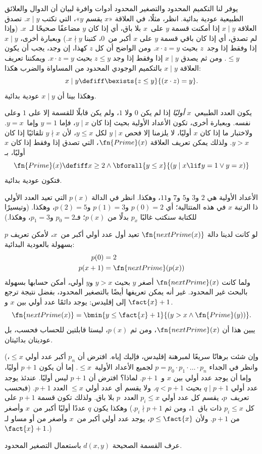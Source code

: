 \documentclass[../../../include/open-logic-section]{subfiles}
\begin{document}

يوفر لنا التكميم المحدود والتصغير المحدود أدوات وافرة لبيان أن الدوال
والعلائق الطبيعية عودية بدائية. انظر، مثلًا، في العلاقة «$x$ يقسم
$y$»، التي تكتب $x\mid y$. تصدق العلاقة $x\mid y$ إذا أمكنت قسمة
$y$ على~$x$ بلا باق، أي إذا كان $y$ مضاعفًا صحيحًا لـ~$x$. (وإذا لم
تصدق، أي إذا كان باقي قسمة $y$ على $x$ أكبر من~$0$، كتبنا
$x\nmid y$.) وبعبارة أخرى، $x\mid y$ إذا وفقط إذا وجد~$z$ بحيث
$x\cdot z=y$. ومن الواضح أن كل $z$ كهذا، إن وجد، يجب أن يكون
$\leq y$. ومن ثم يصدق $x\mid y$ إذا وفقط إذا وجد $z\le y$ بحيث
$x\cdot z=y$. ويمكننا تعريف العلاقة $x\mid y$ بالتكميم الوجودي
المحدود من المساواة والضرب هكذا:
\[
x \mid y \defiff \bexists{z \leq y}{(x \cdot z) = y}.
\]
وهكذا بينا أن $x\mid y$ عودية بدائية.

يكون العدد الطبيعي~$x$ \emph{أوليًا} إذا لم يكن $0$ ولا $1$، ولم
يكن قابلًا للقسمة إلا على $1$ وعلى نفسه. وبعبارة أخرى، تكون الأعداد
الأولية بحيث إذا كان $y\mid x$، فإما $y=1$ وإما~$y=x$. ولاختبار ما
إذا كان $x$ أوليًا، لا يلزمنا إلا فحص $y\mid x$ لكل $y\le x$، لأن
$y\nmid x$ تلقائيًا إذا كان $y>x$. ولذلك يمكن تعريف العلاقة
$\fn{Prime}(x)$، التي تصدق إذا وفقط إذا كان $x$ أوليًا، بـ
\[
\fn{Prime}(x) \defiff x \geq 2 \land \bforall{y \leq x}{(y \mid x \lif y
  = 1 \lor y = x)}
\]
فتكون عودية بدائية.

الأعداد الأولية هي $2$ و$3$ و$5$ و$7$ و$11$، وهكذا. انظر في الدالة
$p(x)$ التي تعيد العدد الأولي ذا الرتبة $x$ في هذه المتتالية؛ أي
$p(0)=2$ و$p(1)=3$ و$p(2)=5$، وهكذا. (وتيسيرًا للكتابة سنكتب غالبًا
$p_x$ بدلًا من $p(x)$؛ فـ$p_0=2$ و$p_1=3$، وهكذا.)

لو كانت لدينا دالة $\fn{nextPrime(x)}$ تعيد أول عدد أولي أكبر من~$x$،
لأمكن تعريف $p$ بسهولة بالعودية البدائية:
\begin{align*}
  p(0) & = 2\\
  p(x+1) & = \fn{nextPrime}(p(x))
\end{align*}
ولما كانت $\fn{nextPrime}(x)$ أصغر $y$ بحيث $y>x$ و$y$ أولي، أمكن
حسابها بسهولة بالبحث غير المحدود. غير أنه يمكن تعريفها أيضًا بالتصغير
المحدود، بفضل نتيجة ترجع إلى إقليدس: يوجد دائمًا عدد أولي بين $x$ و
$\fact{x}+1$.
\[
  \fn{nextPrime(x)} =
  \bmin{y \leq \fact{x}+1}{(y > x \land \fn{Prime}(y))}.
\]
يبين هذا أن $\fn{nextPrime}(x)$، ومن ثم $p(x)$، ليستا قابلتين للحساب
فحسب، بل عوديتان بدائيتان.

(وإن شئت برهانًا سريعًا لمبرهنة إقليدس، فإليك إياه. افترض أن $p_n$
أكبر عدد أولي $\le x$، وانظر في الجداء
$p=p_0\cdot p_1\cdot\dots\cdot p_n$ لجميع الأعداد الأولية~$\le x$.
إما أن يكون $p+1$ أوليًا، وإما أن يوجد عدد أولي بين $x$ و~$p+1$.
لماذا؟ افترض أن $p+1$ ليس أوليًا. عندئذ يوجد عدد أولي $q\mid p+1$
بحيث $q<p+1$. ولا يقسم أي عدد أولي $\le x$ العدد $p+1$. (فبحسب
تعريف~$p$، يقسم كل عدد أولي $p_i\le x$ العدد~$p$ بلا باق. ولذلك تكون
قسمة $p+1$ على كل $p_i\le x$ ذات باق~$1$، ومن ثم
$p_i\nmid p+1$.) وهكذا يكون $q$ عددًا أوليًا أكبر من~$x$ وأصغر من
$p+1$. ولأن $p\le\fact{x}$، يوجد عدد أولي أكبر من~$x$ وأصغر من أو
مساو لـ$\fact{x}+1$.)

\begin{prob}
عرف القسمة الصحيحة $d(x,y)$ باستعمال التصغير المحدود.
\end{prob}
\end{document}
